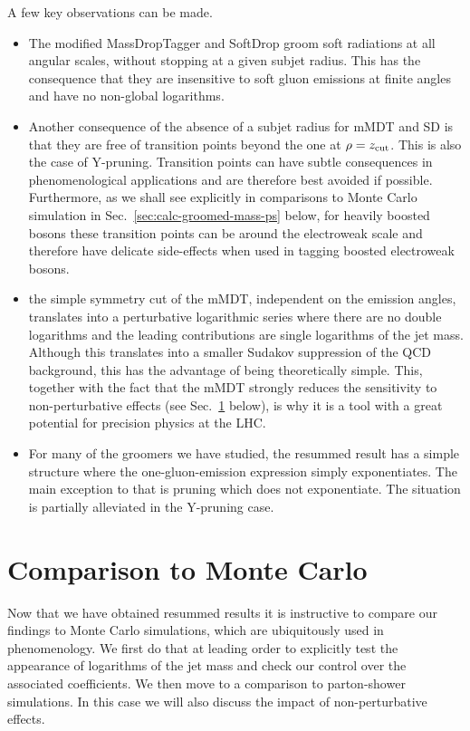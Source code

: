 A few key observations can be made.
\begin{itemize}
\item The modified MassDropTagger and SoftDrop groom soft radiations
  at all angular scales, \ie without stopping at a given subjet
  radius. This has the consequence that they are insensitive to soft
  gluon emissions at finite angles and have no non-global logarithms.
\item Another consequence of the absence of a subjet radius for mMDT
  and SD is that they are free of transition points beyond the one at
  $\rho=z_{\text{cut}}$. This is also the case of Y-pruning.
  Transition points can have subtle consequences in phenomenological
  applications and are therefore best avoided if possible.
  Furthermore, as we shall see explicitly in comparisons to Monte
  Carlo simulation in Sec.~\ref{sec:calc-groomed-mass-ps} below,
  for heavily boosted bosons these transition points can be around the
  electroweak scale and therefore have delicate side-effects when used
  in tagging boosted electroweak bosons.
\item the simple symmetry cut of the mMDT, independent on the emission
  angles, translates into a perturbative logarithmic series where
  there are no double logarithms and the leading contributions are
  single logarithms of the jet mass.
  Although this translates into a smaller Sudakov suppression of the
  QCD background, this has the advantage of being theoretically
  simple. This, together with the fact that the mMDT strongly reduces
  the sensitivity to non-perturbative effects (see
  Sec.~\ref{sec:calc-groomed-mass-mc} below), is why it is a tool
  with a great potential for precision physics at the LHC.
\item For many of the groomers we have studied, the resummed result
  has a simple structure where the one-gluon-emission expression
  simply exponentiates. The main exception to that is pruning which
  does not exponentiate. The situation is partially alleviated in the
  Y-pruning case.
\end{itemize}



\section{Comparison to Monte Carlo}\label{sec:calc-groomed-mass-mc}

Now that we have obtained resummed results it is instructive to
compare our findings to Monte Carlo simulations, which are ubiquitously used in phenomenology.
 We first do that at
leading order to explicitly test the appearance of logarithms of the
jet mass and check our control over the associated coefficients. We
then move to a comparison to parton-shower simulations. In
this case we will also discuss the impact of non-perturbative effects.

